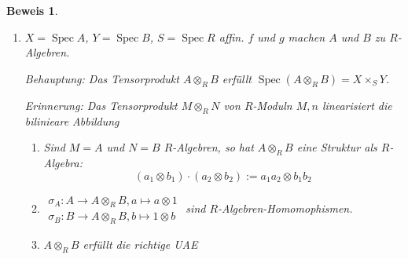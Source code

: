 \documentclass[paper = A4, fontsize=12pt, numbers=noendperiod, chapterprefix=true]{scrbook}
\theoremstyle{break}
\theoremstyle{nonumberbreak}
\newtheorem{bew}{Beweis}
\theoremstyle{nonumberplain}
\newcommand{\quot}[1]{\textrm{\glqq}{#1}\textrm{\grqq}}
\DeclareMathOperator{\Spec}{Spec}
\newcommand{\X}{\times}
\begin{document}
\begin{bew}\begin{enumerate}[(1)]
\item
	$X= \Spec A$, $Y =\Spec B$, $S =\Spec R$ affin. $f$ und $g$ machen $A$ und $B$ zu $R$-Algebren.
	
	\emph{Behauptung:} Das Tensorprodukt $A \otimes_R B$ erf\"ullt $\Spec (A \otimes_R B) = X \X_S Y$.
	
	\emph{Erinnerung:} Das Tensorprodukt $M \otimes_R N$ von $R$-Moduln $M,n$ \quot{linearisiert} die bilinieare Abbildung
	\begin{center}\end{center}
	
	\begin{enumerate}[\textbullet]
	\item
		Sind $M=A$ und $N=B$ $R$-Algebren, so hat $A \otimes_R B$ eine Struktur als $R$-Algebra:
			\[(a_1 \otimes b_1) \cdot (a_2 \otimes b_2) := a_1a_2 \otimes b_1b_2\]
	\item
		$\begin{array}{l} \sigma_A: A \to A \otimes_R B, a \mapsto a \otimes 1 \\ \sigma_B: B \to A \otimes_R B, b \mapsto 1 \otimes b \end{array}$ sind $R$-Algebren-Homomophismen.
	\item
		$A \otimes_R B$ erf\"ullt die richtige UAE
		\begin{center}
\end{center}
\end{enumerate}
\end{enumerate}
\end{bew}
\end{document}
